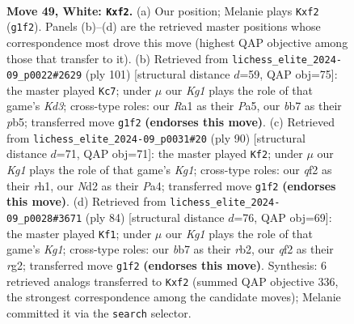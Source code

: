 \documentclass[11pt]{article}
\begin{document}
\clearpage

\begin{figure}[p]\centering
\begin{subfigure}{0.46\textwidth}\centering
\resizebox{\linewidth}{!}{%
\newchessgame
\chessboard[
  setfen={1r2r3/Rb3p1k/1p4p1/8/7P/1P6/2PN1q2/R2B2K1 w - - 0 49},
  showmover=false,
  pgfstyle=straightmove, color=movearrow, markmove={g1-f2}
]}
\caption{}
\end{subfigure}\hfill
\begin{subfigure}{0.46\textwidth}\centering
\resizebox{\linewidth}{!}{%
\newchessgame
\chessboard[
  setfen={7r/7r/3kQp2/pP1n4/5PP1/6K1/1P6/4R3 b - - 0 51},
  showmover=false,
  pgfstyle=straightmove, color=movearrow, markmove={d6-c7}
]}
\caption{}
\end{subfigure}
\\[4pt]
\begin{subfigure}{0.46\textwidth}\centering
\resizebox{\linewidth}{!}{%
\newchessgame
\chessboard[
  setfen={6k1/7p/2b1r3/B1R2R2/P5P1/2P5/1P6/6Kr w - - 1 46},
  showmover=false,
  pgfstyle=straightmove, color=movearrow, markmove={g1-f2}
]}
\caption{}
\end{subfigure}\hfill
\begin{subfigure}{0.46\textwidth}\centering
\resizebox{\linewidth}{!}{%
\newchessgame
\chessboard[
  setfen={5k2/5p2/3p2p1/1B1P3p/5P2/2P1R3/1r4r1/4R1K1 w - - 8 43},
  showmover=false,
  pgfstyle=straightmove, color=movearrow, markmove={g1-f1}
]}
\caption{}
\end{subfigure}
\caption{\textbf{Move 49, White: \texttt{Kxf2}.} (a) Our position; Melanie plays \texttt{Kxf2} (\texttt{g1f2}). Panels (b)--(d) are the retrieved master positions whose correspondence most drove this move (highest QAP objective among those that transfer to it). (b) Retrieved from \texttt{lichess\_elite\_2024-09\_p0022\#2629} (ply 101) [structural distance $d$=59, QAP obj=75]: the master played \texttt{Kc7}; under $\mu$ our \emph{Kg1} plays the role of that game's \emph{Kd3}; cross-type roles: our \emph{R}a1 as their \emph{P}a5, our \emph{b}b7 as their \emph{p}b5; transferred move \texttt{g1f2} \textbf{(endorses this move)}. (c) Retrieved from \texttt{lichess\_elite\_2024-09\_p0031\#20} (ply 90) [structural distance $d$=71, QAP obj=71]: the master played \texttt{Kf2}; under $\mu$ our \emph{Kg1} plays the role of that game's \emph{Kg1}; cross-type roles: our \emph{q}f2 as their \emph{r}h1, our \emph{N}d2 as their \emph{P}a4; transferred move \texttt{g1f2} \textbf{(endorses this move)}. (d) Retrieved from \texttt{lichess\_elite\_2024-09\_p0028\#3671} (ply 84) [structural distance $d$=76, QAP obj=69]: the master played \texttt{Kf1}; under $\mu$ our \emph{Kg1} plays the role of that game's \emph{Kg1}; cross-type roles: our \emph{b}b7 as their \emph{r}b2, our \emph{q}f2 as their \emph{r}g2; transferred move \texttt{g1f2} \textbf{(endorses this move)}. Synthesis: 6 retrieved analogs transferred to \texttt{Kxf2} (summed QAP objective 336, the strongest correspondence among the candidate moves); Melanie committed it via the \texttt{search} selector.}
\label{fig:thought-m96}
\end{figure}
\end{document}
